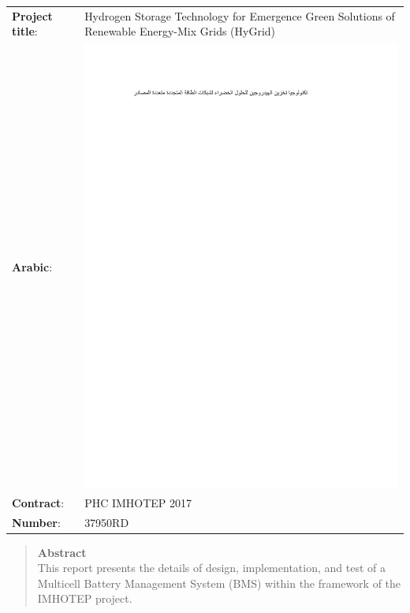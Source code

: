 \documentclass[%
DIV=12,
abstract=on
12pt,			%
]
{scrartcl} %
\begin{document}
    \noindent\begin{tabular}{lp{10cm}}
       \textbf{Project title}: & Hydrogen Storage Technology for Emergence Green Solutions
       of Renewable Energy-Mix Grids (HyGrid)\\ 
        \textbf{Arabic}:&  \includegraphics[width=\linewidth]{figures/arabicTitle} \\ 
        \textbf{Contract}: & PHC IMHOTEP 2017 \\ 
         \textbf{Number}:&  37950RD\\ 
    \end{tabular} 

    \vfill
   \begin{abstract}
      \noindent\textbf{Abstract}\\
      \noindent This report presents the details of design, implementation, and test of a Multicell Battery Management System (BMS) within the framework of the IMHOTEP project.
\end{abstract}
    \clearpage
            \pagestyle{scrheadings}
    \tableofcontents
\end{document}
